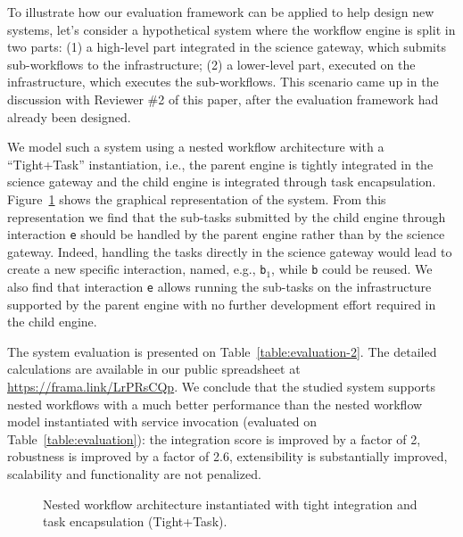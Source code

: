 \documentclass[preprint,3p,twocolumn]{elsarticle}
\newcommand{\correction}[1]{\color{blue}#1\color{black}\xspace}
\begin{document}
\correction{To illustrate how our evaluation framework can be applied
  to help design new systems, let's consider a hypothetical system
  where the workflow engine is split in two parts: (1) a high-level
  part integrated in the science gateway, which submits sub-workflows
  to the infrastructure; (2) a lower-level part, executed on the
  infrastructure, which executes the sub-workflows. This scenario came
  up in the discussion with Reviewer \#2 of this paper, after the
  evaluation framework had already been designed.

  We model such a system using a nested workflow architecture with a
  ``Tight+Task'' instantiation, i.e., the parent engine is tightly
  integrated in the science gateway and the child engine is
  integrated through task encapsulation.  Figure~\ref{fig:nested-3}
  shows the graphical representation of the system. From this
  representation we find that the sub-tasks submitted by the child
  engine through interaction \texttt{e} should be handled by the
  parent engine rather than by the science gateway. Indeed, handling
  the tasks directly in the science gateway would lead to create a new
  specific interaction, named, e.g., \texttt{b$_1$}, while \texttt{b}
  could be reused. We also find that interaction \texttt{e} allows
  running the sub-tasks on the infrastructure supported by the parent
  engine with no further development effort required in the child
  engine.

  The system evaluation is presented on
  Table~\ref{table:evaluation-2}. The detailed calculations are
  available in our public spreadsheet at
  \url{https://frama.link/LrPRsCQp}. We conclude that the studied system
  supports nested workflows with a much better performance than the
  nested workflow model instantiated with service invocation
  (evaluated on Table~\ref{table:evaluation}): the integration score
  is improved by a factor of 2, robustness is improved by a factor of
  2.6, extensibility is substantially improved, scalability and
  functionality are not penalized.  }

\begin{figure}
  \centering
  \def\svgwidth{0.5\columnwidth}
  
\caption{\correction{Nested workflow architecture instantiated with tight integration and task encapsulation (Tight+Task).}}
\label{fig:nested-3}
\end{figure}
\end{document}
